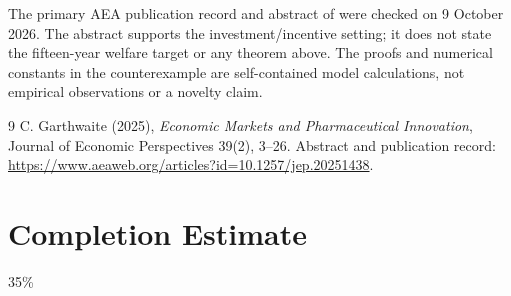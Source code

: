 \documentclass[11pt]{article}
\begin{document}
The primary AEA publication record and abstract of \cite{G} were checked
on 9 October 2026. The abstract supports the investment/incentive setting;
it does not state the fifteen-year welfare target or any theorem above.
The proofs and numerical constants in the counterexample are self-contained
model calculations, not empirical observations or a novelty claim.
\begin{thebibliography}{9}
 C. Garthwaite (2025), \emph{Economic Markets and Pharmaceutical
Innovation}, Journal of Economic Perspectives 39(2), 3--26. Abstract and
publication record: \url{https://www.aeaweb.org/articles?id=10.1257/jep.20251438}.
\end{thebibliography}

\section{Completion Estimate}
35\%
\end{document}
